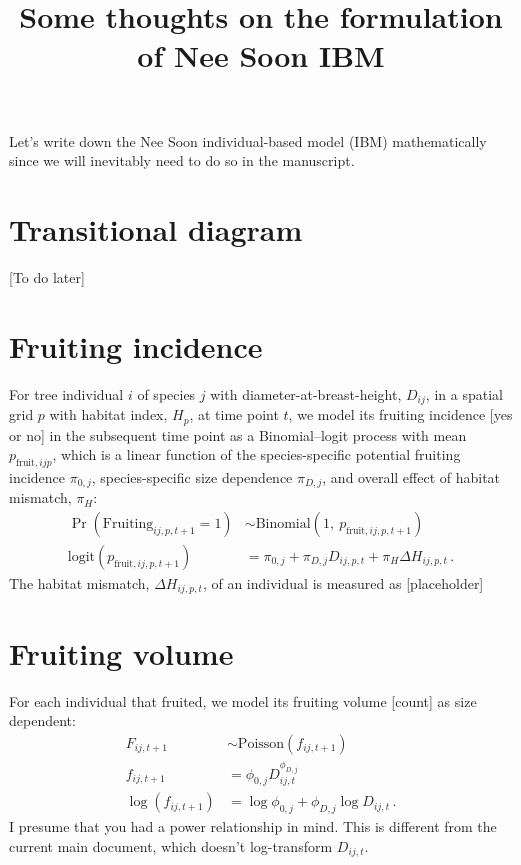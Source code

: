\documentclass[12pt,a4paper]{article}
\author{}
\title{Some thoughts on the formulation of Nee Soon IBM}
\begin{document}
\maketitle

Let's write down the Nee Soon individual-based model (IBM) mathematically since we will inevitably need to do so in the manuscript.

\section{Transitional diagram}

[To do later]

\section{Fruiting incidence}
For tree individual $i$ of species $j$ with diameter-at-breast-height, $D_{ij}$, in a spatial grid $p$ with habitat index, $H_p$, at time point $t$, we model its fruiting incidence [yes or no] in the subsequent time point as a Binomial--logit process with mean $p_{\text{fruit},ijp}$, which is a linear function of the species-specific potential fruiting incidence $\pi_{0,j}$, species-specific size dependence $\pi_{D,j}$, and overall effect of habitat mismatch, $\pi_H$:
\begin{align}
\Pr\left(\text{Fruiting}_{ij,p,t+1}=1\right) &\sim \text{Binomial}\left(1,~p_{\text{fruit},ij,p,t+1}\right) \\
\text{logit}\left(p_{\text{fruit},ij,p,t+1}\right) &= \pi_{0,j} + \pi_{D,j} D_{ij,p,t} + \pi_H \Delta H_{ij,p,t} \,.
\end{align}
The habitat mismatch, $\Delta H_{ij,p,t}$, of an individual is measured as [placeholder]

\section{Fruiting volume}
For each individual that fruited, we model its fruiting volume [count] as size dependent:
\begin{align}
F_{ij,t+1} &\sim \text{Poisson}\left(f_{ij,t+1}\right) \\
f_{ij,t+1} &=  \phi_{0,j} D_{ij,t}^{\phi_{D,j}} \label{eq:fruit} \\
\log\left(f_{ij,t+1}\right) &=  \log \phi_{0,j} + \phi_{D,j} \log D_{ij,t} \,.
\end{align}
I presume that you had a power relationship in mind. This is different from the current main document, which doesn't log-transform $D_{ij,t}$.
\end{document}

